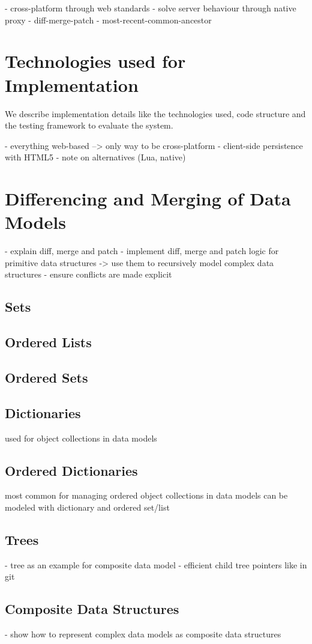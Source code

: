 - cross-platform through web standards
- solve server behaviour through native proxy
- diff-merge-patch
- most-recent-common-ancestor

\section{Technologies used for Implementation}
We describe implementation details like the technologies used, code structure and the testing framework to evaluate the system.

- everything web-based --> only way to be cross-platform
- client-side persistence with HTML5
- note on alternatives (Lua, native)

\section{Differencing and Merging of Data Models}
- explain diff, merge and patch
- implement diff, merge and patch logic for primitive data structures
  -> use them to recursively model complex data structures
- ensure conflicts are made explicit

\subsection{Sets}
\subsection{Ordered Lists}
\subsection{Ordered Sets}
\subsection{Dictionaries}
used for object collections in data models
\subsection{Ordered Dictionaries}
most common for managing ordered object collections in data models
can be modeled with dictionary and ordered set/list
\subsection{Trees}
- tree as an example for composite data model
- efficient child tree pointers like in git

\subsection{Composite Data Structures}
- show how to represent complex data models as composite data structures

